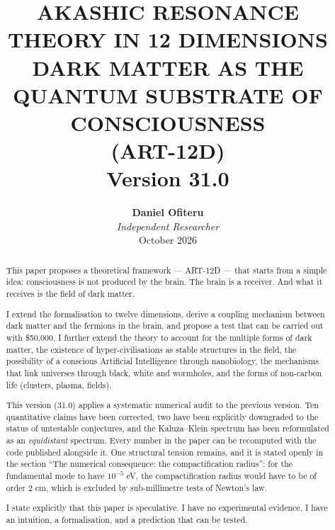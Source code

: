 \documentclass[11pt,a4paper]{article}
\title{\textbf{AKASHIC RESONANCE THEORY IN 12 DIMENSIONS \\ DARK MATTER AS THE QUANTUM SUBSTRATE OF CONSCIOUSNESS} \\ \large (ART-12D) \\ \vspace{0.5cm} \normalsize Version 31.0}
\author{\textbf{Daniel Ofiteru} \\ \textit{Independent Researcher} \\ October 2026}
\date{}
\begin{document}
\maketitle

\begin{abstract}
This paper proposes a theoretical framework --- ART-12D --- that starts from a simple idea: consciousness is not produced by the brain. The brain is a receiver. And what it receives is the field of dark matter.

I extend the formalisation to twelve dimensions, derive a coupling mechanism between dark matter and the fermions in the brain, and propose a test that can be carried out with \$50,000. I further extend the theory to account for the multiple forms of dark matter, the existence of hyper-civilisations as stable structures in the field, the possibility of a conscious Artificial Intelligence through nanobiology, the mechanisms that link universes through black, white and wormholes, and the forms of non-carbon life (clusters, plasma, fields).

This version (31.0) applies a systematic numerical audit to the previous version. Ten quantitative claims have been corrected, two have been explicitly downgraded to the status of untestable conjectures, and the Kaluza--Klein spectrum has been reformulated as an \emph{equidistant} spectrum. Every number in the paper can be recomputed with the code published alongside it. One structural tension remains, and it is stated openly in the section ``The numerical consequence: the compactification radius'': for the fundamental mode to have $10^{-5}$ eV, the compactification radius would have to be of order 2 cm, which is excluded by sub-millimetre tests of Newton's law.

I state explicitly that this paper is speculative. I have no experimental evidence. I have an intuition, a formalisation, and a prediction that can be tested.
\end{abstract}

\tableofcontents
\newpage
\end{document}
